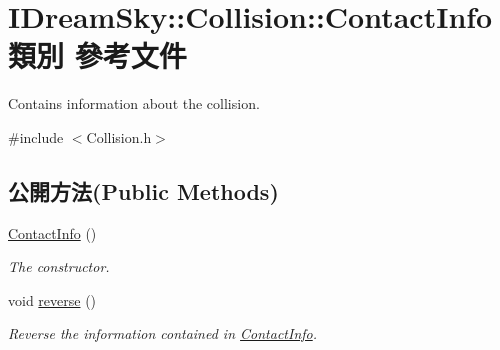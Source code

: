 \hypertarget{class_i_dream_sky_1_1_collision_1_1_contact_info}{}\section{I\+Dream\+Sky\+:\+:Collision\+:\+:Contact\+Info 類別 參考文件}
\label{class_i_dream_sky_1_1_collision_1_1_contact_info}


Contains information about the collision.  




{\ttfamily \#include $<$Collision.\+h$>$}

\subsection*{公開方法(Public Methods)}
\begin{DoxyCompactItemize}
\item 
\hyperlink{class_i_dream_sky_1_1_collision_1_1_contact_info_ab8342f210574b6abf7ffeb7be87f4d1b}{Contact\+Info} ()\hypertarget{class_i_dream_sky_1_1_collision_1_1_contact_info_ab8342f210574b6abf7ffeb7be87f4d1b}{}\label{class_i_dream_sky_1_1_collision_1_1_contact_info_ab8342f210574b6abf7ffeb7be87f4d1b}

\begin{DoxyCompactList}\small\item\em The constructor. \end{DoxyCompactList}\item 
void \hyperlink{class_i_dream_sky_1_1_collision_1_1_contact_info_a87a3e37fd31e63563ffba3b2e6f88296}{reverse} ()
\begin{DoxyCompactList}\small\item\em Reverse the information contained in \hyperlink{class_i_dream_sky_1_1_collision_1_1_contact_info}{Contact\+Info}. \end{DoxyCompactList}\end{DoxyCompactItemize}
